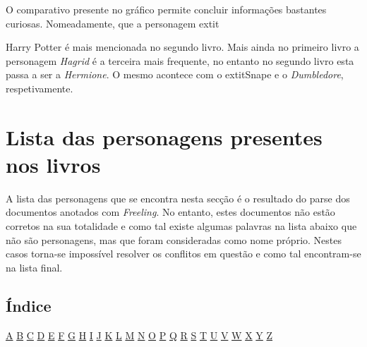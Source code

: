 \documentclass[a4paper]{article}
\begin{document}
O comparativo presente no gráfico permite concluir informações bastantes curiosas. Nomeadamente, que a personagem 	extit{Harry Potter é mais mencionada no segundo livro. Mais ainda no primeiro livro a personagem \textit{Hagrid} é a terceira mais frequente, no entanto no segundo livro esta passa a ser a \textit{Hermione}. O mesmo acontece com o 	extit{Snape} e o \textit{Dumbledore}, respetivamente.
\newpage
\section{Lista das personagens presentes nos livros}
\hspace{4mm} A lista das personagens que se encontra nesta secção é o resultado do parse dos documentos anotados com \textit{Freeling}. No entanto, estes documentos não estão corretos na sua totalidade e como tal existe algumas palavras na lista abaixo que não são personagens, mas que foram consideradas como nome próprio. Nestes casos torna-se impossível resolver os conflitos em questão e como tal encontram-se na lista final.
\subsection{Índice}
\hspace{4mm} \hyperlink{A}{A}
\hyperlink{B}{B}
\hyperlink{C}{C}
\hyperlink{D}{D}
\hyperlink{E}{E}
\hyperlink{F}{F}
\hyperlink{G}{G}
\hyperlink{H}{H}
\hyperlink{I}{I}
\hyperlink{J}{J}
\hyperlink{K}{K}
\hyperlink{L}{L}
\hyperlink{M}{M}
\hyperlink{N}{N}
\hyperlink{O}{O}
\hyperlink{P}{P}
\hyperlink{Q}{Q}
\hyperlink{R}{R}
\hyperlink{S}{S}
\hyperlink{T}{T}
\hyperlink{U}{U}
\hyperlink{V}{V}
\hyperlink{W}{W}
\hyperlink{X}{X}
\hyperlink{Y}{Y}
\hyperlink{Z}{Z}
}
\end{document}
